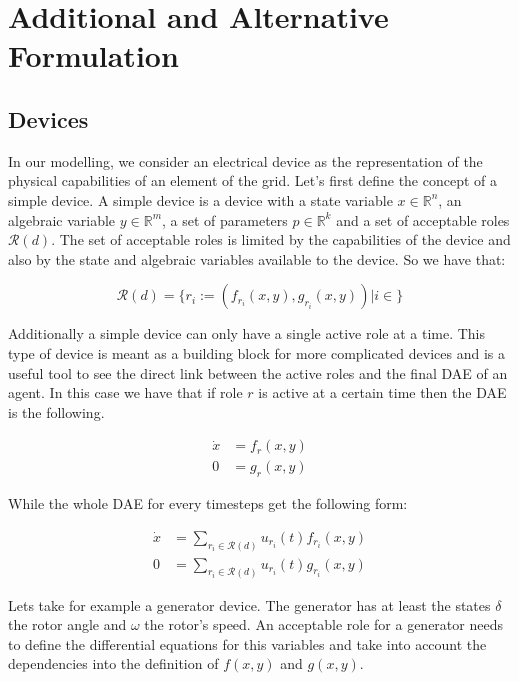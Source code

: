\section[short]{Additional and Alternative Formulation}

\subsection{Devices}

In our modelling, we consider an electrical device as the representation of the physical capabilities of an element of the grid. Let's first define the concept of a simple device. A simple device is a device with a state variable $x \in \mathbb{R}^n$, an algebraic variable $y \in \mathbb{R}^m$, a set of parameters $p \in \mathbb{R}^k$ and a set of acceptable roles $\mathcal{R}(d)$. The set of acceptable roles is limited by the capabilities of the device and also by the state and algebraic variables available to the device. So we have that:

\begin{equation}
    \mathcal{R}(d) = \{ r_i := (f_{r_i}(x,y), g_{r_i}(x,y)) | i \in \}
\end{equation}

Additionally a simple device can only have a single active role at a time. This type of device is meant as a building block for more complicated devices and is a useful tool to see the direct link between the active roles and the final DAE of an agent. In this case we have that if role $r$ is active at a certain time then the DAE is the following.

\begin{align}
    \dot{x} &= f_r(x,y)\\
    0 &= g_r(x,y) 
\end{align}

While the whole DAE for every timesteps get the following form:

\begin{align}
    \dot{x} &= \sum_{r_i \in \mathcal{R}(d)} u_{r_i}(t) f_{r_i}(x,y)\\
    0 &= \sum_{r_i \in \mathcal{R}(d)} u_{r_i}(t) g_{r_i}(x,y)
\end{align}


Lets take for example a generator device. The generator has at least the states $\delta$ the rotor angle and $\omega$ the rotor's speed. An acceptable role for a generator needs to define the differential equations for this variables and take into account the dependencies into the definition of $f(x,y)$ and $g(x,y)$.

